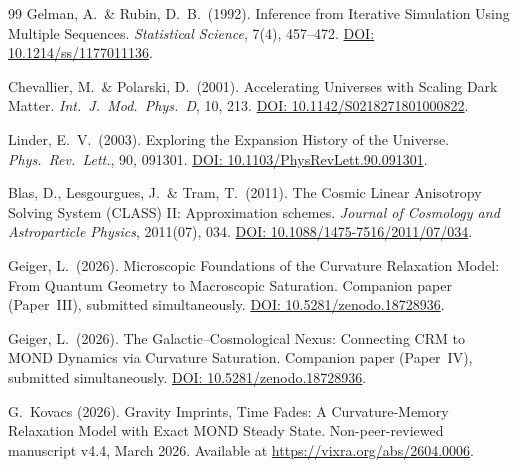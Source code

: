 \documentclass[aps,prd,twocolumn,superscriptaddress,nofootinbib]{revtex4-2}
\begin{document}
\begin{thebibliography}{99}
Gelman, A.\ \& Rubin, D.~B.\ (1992).
Inference from Iterative Simulation Using Multiple Sequences.
\textit{Statistical Science}, 7(4), 457--472.
\href{https://doi.org/10.1214/ss/1177011136}{DOI: 10.1214/ss/1177011136}.

Chevallier, M.\ \& Polarski, D.\ (2001).
Accelerating Universes with Scaling Dark Matter.
\textit{Int.\ J.\ Mod.\ Phys.\ D}, 10, 213.
\href{https://doi.org/10.1142/S0218271801000822}{DOI: 10.1142/S0218271801000822}.

Linder, E.~V.\ (2003).
Exploring the Expansion History of the Universe.
\textit{Phys.\ Rev.\ Lett.}, 90, 091301.
\href{https://doi.org/10.1103/PhysRevLett.90.091301}{DOI: 10.1103/PhysRevLett.90.091301}.

Blas, D., Lesgourgues, J.\ \& Tram, T.\ (2011).
The Cosmic Linear Anisotropy Solving System (CLASS) II: Approximation schemes.
\textit{Journal of Cosmology and Astroparticle Physics}, 2011(07), 034.
\href{https://doi.org/10.1088/1475-7516/2011/07/034}{DOI: 10.1088/1475-7516/2011/07/034}.

Geiger, L.\ (2026).
Microscopic Foundations of the Curvature Relaxation Model: From Quantum Geometry to Macroscopic Saturation.
Companion paper (Paper~III), submitted simultaneously.
\href{https://doi.org/10.5281/zenodo.18728936}{DOI: 10.5281/zenodo.18728936}.

Geiger, L.\ (2026).
The Galactic--Cosmological Nexus: Connecting CRM to MOND Dynamics via Curvature Saturation.
Companion paper (Paper~IV), submitted simultaneously.
\href{https://doi.org/10.5281/zenodo.18728936}{DOI: 10.5281/zenodo.18728936}.

G.~Kovacs (2026).
Gravity Imprints, Time Fades: A Curvature-Memory Relaxation Model with Exact MOND Steady State.
Non-peer-reviewed manuscript v4.4, March 2026.
Available at \url{https://vixra.org/abs/2604.0006}.

\end{thebibliography}
\end{document}

